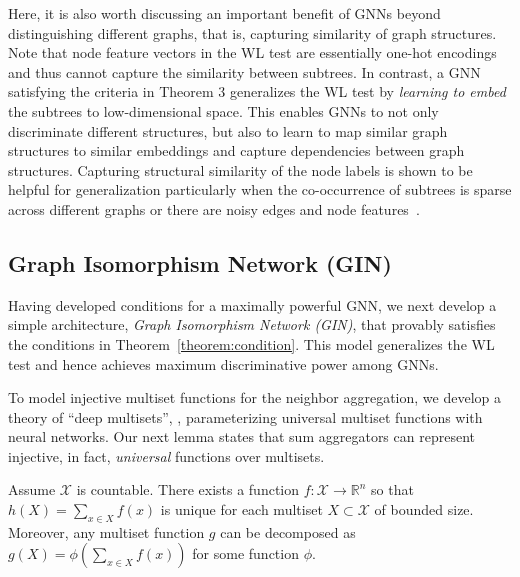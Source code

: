 Here, it is also worth discussing an important benefit of GNNs beyond distinguishing different graphs, that is, capturing similarity of graph structures. Note that node feature vectors in the WL test are essentially one-hot encodings and thus cannot capture the
similarity between subtrees. In contrast, a GNN satisfying the criteria in Theorem 3 generalizes
the WL test by \textit{learning to embed} the subtrees to low-dimensional space. This enables GNNs to not
only discriminate different structures, but also to learn to map similar graph structures to similar
embeddings and capture dependencies between graph structures. Capturing structural similarity of the node labels is shown to be helpful for generalization particularly when the co-occurrence of subtrees is sparse across different graphs or there are noisy edges and node features~\citep{yanardag2015deep}.


\subsection{Graph Isomorphism Network (GIN)}
\label{subsec:gin}
Having developed conditions for a maximally powerful GNN, we next develop a simple architecture, \textit{Graph Isomorphism Network (GIN)}, that provably satisfies the conditions in Theorem~\ref{theorem:condition}. This model generalizes the WL test and hence achieves maximum discriminative power among GNNs. %

To model injective multiset functions for the neighbor aggregation, we develop a theory of ``deep multisets'', \ie, parameterizing universal multiset functions with neural networks. Our next lemma states that sum aggregators can represent injective, in fact, \emph{universal} functions over multisets. 

\begin{lemma}
\label{theorem:sum}
Assume $\mathcal{X}$ is countable. There exists a function $f:\mathcal{X}\rightarrow\mathbb{R}^n$ so that $h(X) = \sum_{x \in X} f(x)$ is unique for each multiset $X \subset \mathcal{X}$ of bounded size. Moreover, any multiset function $g$ can be decomposed as $g\left( X \right)=\phi \left(\sum_{x \in X} f(x)\right)$ for some function $\phi$. 
\end{lemma}
\vspace{-0.05in}

